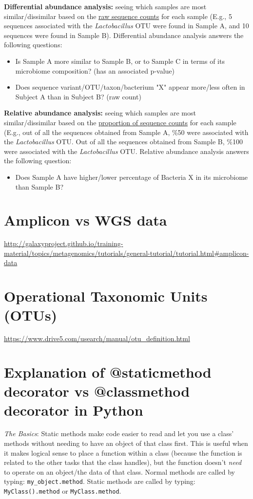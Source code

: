 \begin{fullpage}
    \textbf{Differential abundance analysis:} seeing which samples are most similar/dissimilar based on the \ul{raw sequence counts} for each sample (E.g., 5 sequences associated with the \textit{Lactobacillus} OTU were found in Sample A, and 10 sequences were found in Sample B). Differential abundance analysis answers the following questions:
    \begin{itemize}
        \item Is Sample A more similar to Sample B, or to Sample C in terms of its microbiome composition? (has an associated p-value)
        \item Does sequence variant/OTU/taxon/bacterium "X" appear more/less often in Subject A than in Subject B? (raw count) 
    \end{itemize}
    \textbf{Relative abundance analysis:} seeing which samples are most similar/dissimilar based on the \ul{proportion of sequence counts} for each sample (E.g., out of all the sequences obtained from Sample A, \%50 were associated with the \textit{Lactobacillus} OTU. Out of all the sequences obtained from Sample B, \%100 were associated with the \textit{Lactobacillus} OTU. Relative abundance analysis answers the following question:
    \begin{itemize}
    \item Does Sample A have higher/lower percentage of Bacteria X in its microbiome than Sample B?
    \end{itemize}


    \section{Amplicon vs WGS data}
    \label{appendix:amplicon}
    \url{http://galaxyproject.github.io/training-material/topics/metagenomics/tutorials/general-tutorial/tutorial.html#amplicon-data}


    \section{Operational Taxonomic Units (OTUs)}
    \label{appendix:otu}
    \url{https://www.drive5.com/usearch/manual/otu_definition.html}


    \section{Explanation of @staticmethod decorator vs @classmethod decorator in Python}
    \label{app:static-method}
    \textit{The Basics}: Static methods make code easier to read and let you use a class' methods without needing to have an object of that class first. This is useful when it makes logical sense to place a function within a class (because the function is related to the other tasks that the class handles), but the function doesn't \textit{need} to operate on an object/the data of that class. Normal methods are called by typing: \verb|my_object.method|. Static methods are called by typing: \verb|MyClass().method| or \verb|MyClass.method|.
    

\end{fullpage}
